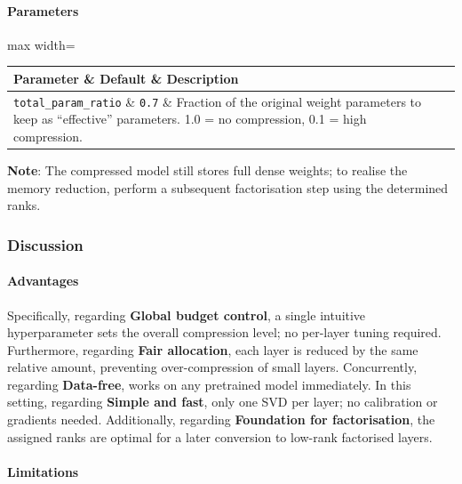 \paragraph{Parameters}

\begin{center}
\begin{adjustbox}{max width=\columnwidth}
\renewcommand{\arraystretch}{1.2}
\begin{tabular}{lll}
\toprule
Parameter \& Default \& Description \\
\midrule
\texttt{total\_param\_ratio} \& \texttt{0.7} \& Fraction of the original weight parameters to keep as ``effective'' parameters. 1.0 = no compression, 0.1 = high compression. \\

\bottomrule
\end{tabular}
\end{adjustbox}
\end{center}
\textbf{Note}: The compressed model still stores full dense weights; to realise the memory reduction, perform a subsequent factorisation step using the determined ranks.


\subsubsection*{Discussion}

\paragraph{Advantages}

Specifically, regarding \textbf{Global budget control}, a single intuitive hyperparameter sets the overall compression level; no per-layer tuning required. Furthermore, regarding \textbf{Fair allocation}, each layer is reduced by the same relative amount, preventing over-compression of small layers. Concurrently, regarding \textbf{Data-free}, works on any pretrained model immediately. In this setting, regarding \textbf{Simple and fast}, only one SVD per layer; no calibration or gradients needed. Additionally, regarding \textbf{Foundation for factorisation}, the assigned ranks are optimal for a later conversion to low-rank factorised layers.


\paragraph{Limitations}

